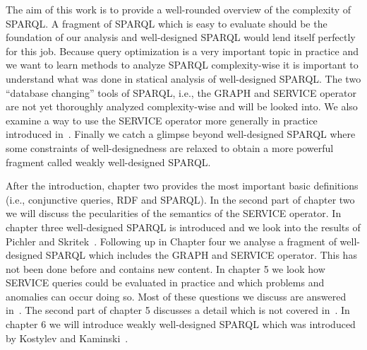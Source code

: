 The aim of this work is to provide a well-rounded overview of the complexity of
SPARQL. A fragment of SPARQL which is easy to evaluate should be the foundation
of our analysis and well-designed SPARQL 
would lend itself perfectly for this job. Because query optimization is a very
important topic in practice and we want to learn methods to analyze SPARQL
complexity-wise it is important to
understand what was done in statical analysis of well-designed SPARQL. The two ``database changing'' tools of SPARQL, i.e., the GRAPH and
SERVICE operator are not yet thoroughly analyzed complexity-wise and will be looked into. 
We also examine a way to use the SERVICE operator more generally in practice introduced
in~\cite{kaminski_bwd}. Finally we catch a glimpse beyond well-designed SPARQL where some constraints of
well-designedness are relaxed to obtain a more powerful fragment called weakly well-designed SPARQL.

After the introduction, chapter two provides the most important basic definitions
(i.e., conjunctive queries, RDF and SPARQL). In the second part of chapter two
we will discuss the pecularities of the semantics
of the SERVICE operator. In chapter three well-designed SPARQL is introduced and
we look into the results of Pichler and Skritek~\cite{pichler2014containment}. Following up
in Chapter four we analyse a fragment of well-designed SPARQL which includes 
the GRAPH and SERVICE operator. This has not been done before and contains new
content. In chapter 5 we look how SERVICE queries could be evaluated in practice
and which problems and anomalies can occur doing so. Most of these questions we
discuss are answered in~\cite{BuilAranda20131}. The second part of chapter
5 discusses a detail which is not covered in~\cite{BuilAranda20131}. In chapter
6 we will introduce weakly well-designed SPARQL which was introduced by Kostylev and Kaminski~\cite{kaminski_bwd}.

